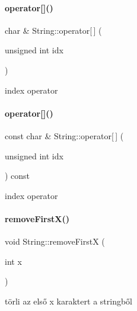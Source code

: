 \paragraph{\texorpdfstring{operator[]()}{operator[]()}\hspace{0.1cm}{\footnotesize\ttfamily [1/2]}}
{\footnotesize\ttfamily char \& String\+::operator\mbox{[}$\,$\mbox{]} (\begin{DoxyParamCaption}\item[{unsigned int}]{idx }\end{DoxyParamCaption})}



index operator 

\mbox{\label{class_string_aaa249e62641872197679cfc7c66118c0}} 
\paragraph{\texorpdfstring{operator[]()}{operator[]()}\hspace{0.1cm}{\footnotesize\ttfamily [2/2]}}
{\footnotesize\ttfamily const char \& String\+::operator\mbox{[}$\,$\mbox{]} (\begin{DoxyParamCaption}\item[{unsigned int}]{idx }\end{DoxyParamCaption}) const}



index operator 

\mbox{\label{class_string_a15c07ede44c5bcfb0920e9bf63e75670}} 
\paragraph{\texorpdfstring{removeFirstX()}{removeFirstX()}}
{\footnotesize\ttfamily void String\+::remove\+FirstX (\begin{DoxyParamCaption}\item[{int}]{x }\end{DoxyParamCaption})}



törli az első x karaktert a stringből 

